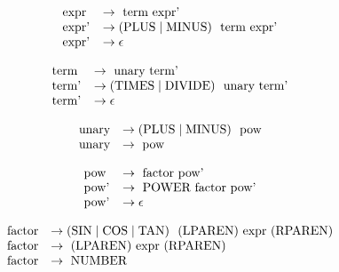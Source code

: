 \documentclass{article}
\begin{document}
\begin{center}
\[
\begin{array}{@{}l l@{}}
\text{expr }   &\rightarrow \text{ term expr'} \\
\text{expr'}   &\rightarrow (\text{PLUS} \mid \text{MINUS})\ \text{ term expr'} \\
\text{expr'}   &\rightarrow \epsilon
\end{array}
\]

\[
\begin{array}{@{}l l@{}}
\text{term }   &\rightarrow \text{ unary term'} \\
\text{term'}   &\rightarrow (\text{TIMES} \mid \text{DIVIDE})\ \text{ unary term'} \\
\text{term'}   &\rightarrow \epsilon
\end{array}
\]

\[
\begin{array}{@{}l l@{}}
\text{unary}   &\rightarrow (\text{PLUS} \mid \text{MINUS})\ \text{ pow} \\
\text{unary}   &\rightarrow \text{ pow}
\end{array}
\]

\[
\begin{array}{@{}l l@{}}
\text{pow }    &\rightarrow \text{ factor pow'} \\
\text{pow'}    &\rightarrow \text{ POWER factor pow'} \\
\text{pow'}    &\rightarrow \epsilon
\end{array}
\]

\[
\begin{array}{@{}l l@{}}
\text{factor} &\rightarrow (\text{SIN} \mid \text{COS} \mid \text{TAN})\ \text{ (LPAREN) expr (RPAREN)} \\
\text{factor}  &\rightarrow \text{ (LPAREN) expr (RPAREN)} \\
\text{factor}  &\rightarrow \text{ NUMBER}
\end{array}
\]

\end{center}
\end{document}
